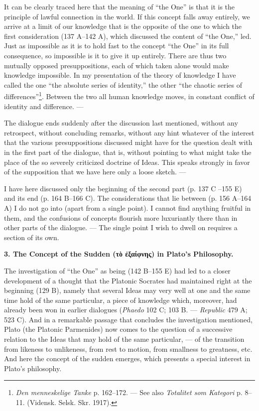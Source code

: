 \documentclass[12pt,a4paper,openany]{book}
\newcommand{\opage}[1]{\marginnote{\footnotesize\textit{[#1]}}}
\newcommand{\chaphead}[1]{\par\bigskip\phantomsection\begin{center}\bfseries #1\end{center}\medskip\ignorespaces}
\begin{document}
\setcounter{footnote}{0}%
\opage{37}It can be clearly traced here that the meaning of ``the One''
is that it is the principle of lawful connection in the world.
If this concept falls away entirely, we arrive at
a limit of our knowledge that is the opposite of the one to which
the first consideration (137 A--142 A), which discussed the content
of ``the One,'' led.  Just as impossible as it is to
hold fast to the concept ``the One'' in its full consequence,
so impossible is it to give it up entirely.  There are thus two
mutually opposed presuppositions, each of which taken alone would
make knowledge impossible.  In my presentation of the theory of knowledge I
have called the one ``the absolute series of identity,''
the other ``the chaotic series of differences''\footnote[1]{\textit{Den menneskelige Tanke} p. 162--172. --- See also \textit{Totalitet som Kategori} p. 8--11. (Vidensk. Selsk. Skr. 1917).}.
Between the two all human knowledge moves, in
constant conflict of identity and difference. ---

The dialogue ends suddenly after the discussion last mentioned,
without any retrospect, without concluding remarks,
without any hint whatever of the interest that the
various presuppositions discussed might have for the question dealt with in the
first part of the dialogue, that is, without
pointing to what might take the place of the so severely
criticized doctrine of Ideas.  This speaks strongly in favor of the supposition
that we have here only a loose sketch. ---

I have here discussed only the beginning of the second part (p. 137 C
--155 E) and its end (p. 164 B--166 C).  The considerations
that lie between (p. 156 A--164 A) I do not go into (apart from a
single point).  I cannot find anything
fruitful in them, and the confusions of concepts flourish more luxuriantly
there than in other parts of the dialogue. --- The single
point I wish to dwell on requires a section of its own.
\setcounter{footnote}{0}%
\opage{38}\chaphead{3. The Concept of the Sudden (τὸ ἐξαίφνης) in Plato's Philosophy.}

The investigation of ``the One'' as being (142 B--155 E)
had led to a closer development of a thought that
the Platonic Socrates had maintained right at the beginning
(129 B), namely that several Ideas may very well at one and the same time
hold of the same particular, a piece of knowledge which, moreover,
had already been won in earlier dialogues (\textit{Phaedo} 102 C;
103 B. --- \textit{Republic} 479 A; 523 C).  And in a remarkable passage
that concludes the investigation mentioned, Plato
(the Platonic Parmenides) now comes to the question of
a successive relation to the Ideas that may hold of the same
particular, --- of the transition from likeness to unlikeness, from
rest to motion, from smallness to greatness, etc.  And
here the concept of the sudden emerges, which presents
a special interest in Plato's philosophy.
\end{document}

